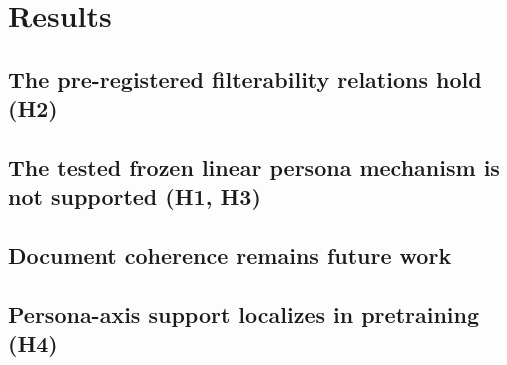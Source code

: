 \section{Results}
\label{sec:results}

\subsection{The pre-registered filterability relations hold (H2)}
\label{sec:results-ordering}



\subsection{The tested frozen linear persona mechanism is not supported (H1, H3)}
\label{sec:results-mechanism}






\subsection{Document coherence remains future work}
\label{sec:results-documents}


\subsection{Persona-axis support localizes in pretraining (H4)}
\label{sec:results-provenance}


